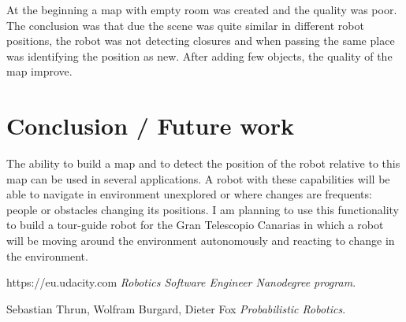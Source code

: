 \documentclass[10pt,journal,compsoc]{IEEEtran}
\begin{document}
At the beginning a map with empty room was created and the quality was poor. The conclusion was that due the scene was quite similar in different robot positions, the robot was not detecting closures and when passing the same place was identifying the position as new. After adding few objects, the quality of the map improve.  
\section{Conclusion / Future work}

The ability to build a map and to detect the position of the robot relative to this map can be used in several applications. A robot with these capabilities will be able to navigate in environment unexplored or where changes are frequents: people or obstacles changing its positions. I am planning to use this functionality to build a tour-guide robot for the Gran Telescopio Canarias in which a robot will be moving around the environment autonomously and reacting to change in the environment.

\begin{thebibliography}{9}


https://eu.udacity.com
\textit{Robotics Software Engineer Nanodegree program}. 

Sebastian Thrun, Wolfram Burgard, Dieter Fox
\textit{Probabilistic Robotics}. 
\end{thebibliography}
\end{document}
